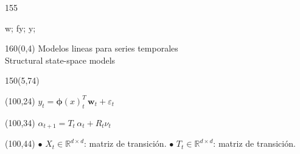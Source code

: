 \documentclass[shownotes,aspectratio=169]{beamer}
\begin{document}
\begin{frame}[plain]
{\begin{textblock}{155}
{     {w};
     {fy};
     {y};

}
\end{textblock}
}





\end{frame}



\begin{frame}[plain]
\begin{textblock}{160}(0,4)
\centering \LARGE Modelos lineas para series temporales \\
\large Structural state-space models
\end{textblock}


\begin{textblock}{150}(5,74)
\raggedright
{}
\end{textblock}


\begin{textblock}{80}(100,24)
$y_t  =  \bm{\phi}(x)_t^T \, \bm{w}_t + \varepsilon_t$
\end{textblock}

\begin{textblock}{80}(100,34)
$\alpha_{t+1} = T_t \, \alpha_t + R_t  \nu_t$
\end{textblock}


\begin{textblock}{80}(100,44)
$\bullet$ $X_t \in \mathbb{R}^{d \times d}$: matriz de transición.
$\bullet$ $T_t \in \mathbb{R}^{d \times d}$: matriz de transición.
\end{textblock}


\end{frame}
\end{document}
